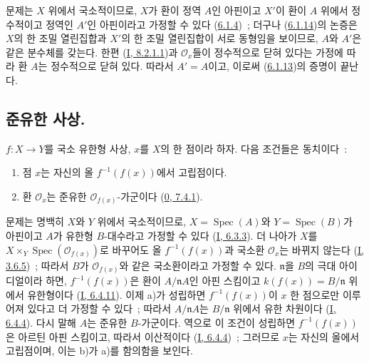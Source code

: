 문제는 $X$ 위에서 국소적이므로, $X$가 환이 정역 $A$인 아핀이고
$X'$이 환이 $A$ 위에서 정수적이고 정역인 $A'$인 아핀이라고 가정할 수
있다 (\hyperref[II.6.1.4-ko]{6.1.4})~; 더구나
(\hyperref[II.6.1.14-ko]{6.1.14})의 논증은 $X$의 한 조밀 열린집합과
$X'$의 한 조밀 열린집합이 서로 동형임을 보이므로, $A$와 $A'$은 같은
분수체를 갖는다. 한편 (\hyperref[I.8.2.1.1-ko]{I, 8.2.1.1})과
$\mathcal{O}_x$들이 정수적으로 닫혀 있다는 가정에 따라 환 $A$는
정수적으로 닫혀 있다. 따라서 $A'=A$이고, 이로써
(\hyperref[II.6.1.13-ko]{6.1.13})의 증명이 끝난다.

\subsection{준유한 사상.}
\label{subsection:II.6.2-ko}

\begin{proposition}[6.2.1]
\label{II.6.2.1-ko}
$f:X\to Y$를 국소 유한형 사상, $x$를 $X$의 한 점이라 하자. 다음
조건들은 동치이다~:


\begin{enumerate}
\item[a)] 점 $x$는 자신의 올 $f^{-1}(f(x))$에서 고립점이다.
\item[b)] 환 $\mathcal{O}_x$는 준유한 $\mathcal{O}_{f(x)}$-가군이다
(\hyperref[0.7.4.1-ko]{0, 7.4.1}).
\end{enumerate}
\end{proposition}

문제는 명백히 $X$와 $Y$ 위에서 국소적이므로,
$X=\operatorname{Spec}(A)$와 $Y=\operatorname{Spec}(B)$가 아핀이고
$A$가 유한형 $B$-대수라고 가정할 수 있다
(\hyperref[I.6.3.3-ko]{I, 6.3.3}). 더 나아가 $X$를
$X\times_Y\operatorname{Spec}(\mathcal{O}_{f(x)})$로 바꾸어도 올
$f^{-1}(f(x))$과 국소환 $\mathcal{O}_x$는 바뀌지 않는다
(\hyperref[I.3.6.5-ko]{I, 3.6.5})~; 따라서 $B$가
$\mathcal{O}_{f(x)}$와 같은 국소환이라고 가정할 수 있다. $\mathfrak{n}$을
$B$의 극대 아이디얼이라 하면, $f^{-1}(f(x))$은 환이
$A/\mathfrak{n}A$인 아핀 스킴이고 $k(f(x))=B/\mathfrak{n}$ 위에서
유한형이다 (\hyperref[I.6.4.11-ko]{I, 6.4.11}). 이제 a)가 성립하면
$f^{-1}(f(x))$이 $x$ 한 점으로만 이루어져 있다고 더 가정할 수 있다~;
따라서 $A/\mathfrak{n}A$는 $B/\mathfrak{n}$ 위에서 유한 차원이다
(\hyperref[I.6.4.4-ko]{I, 6.4.4}). 다시 말해 $A$는 준유한
$B$-가군이다. 역으로 이 조건이 성립하면 $f^{-1}(f(x))$은 아르틴 아핀
스킴이고, 따라서 이산적이다 (\hyperref[I.6.4.4-ko]{I, 6.4.4})~;
그러므로 $x$는 자신의 올에서 고립점이며, 이는 b)가 a)를 함의함을
보인다.

